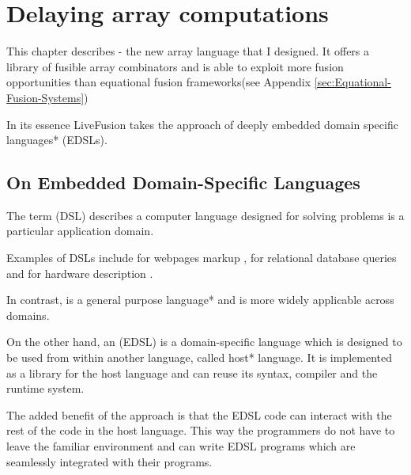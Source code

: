 \documentclass[preamble.tex]{subfiles}
\begin{document}
\clearpage

\chapter{Delaying array computations}

This chapter describes \LiveFusion - the new array language that I designed. It offers a library of fusible array combinators and is able to exploit more fusion opportunities than equational fusion frameworks\ieqfusion (see Appendix \ref{sec:Equational-Fusion-Systems})

In its essence LiveFusion takes the approach of \*deeply embedded domain specific languages* (EDSLs)\iedsl{}.


\section{On Embedded Domain-Specific Languages}
\iedsl{}

The term  (DSL) describes a computer language designed for solving problems is a particular application domain.

Examples of DSLs include  for webpages markup \cite{HTML},  for relational database queries \cite{SQL} and  for hardware description \cite{Verilog}.

In contrast, \Haskell \cite{Pey03} is a \*general purpose language* and is more widely applicable across domains.

On the other hand, an  (EDSL) is a domain-specific language which is designed to be used from within another language, called \*host* language. It is implemented as a library for the host language and can reuse its syntax, compiler and the runtime system.

The added benefit of the approach is that the EDSL code can interact with the rest of the code in the host language. This way the programmers do not have to leave the familiar environment and can write EDSL programs which are seamlessly integrated with their programs.
\end{document}
